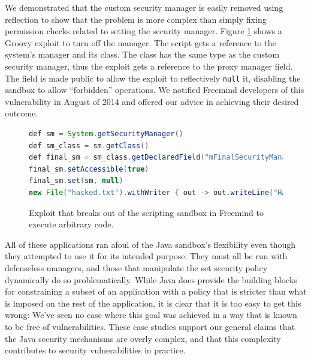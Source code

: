 \documentclass{sig-alternate-05-2015}
\begin{document}
We demonstrated that the custom security manager is easily removed
using reflection to show that the problem is more complex than simply
fixing permission checks related to setting the security manager. Figure \ref{fig:Example-Exploit-for-Freemind}
shows a Groovy exploit to turn off the manager. The script gets a reference to the system's manager
and its class. The class has the same type as the custom security
manager, thus the exploit gets a reference to the proxy manager field.
The field is made public to allow the exploit to reflectively \texttt{null}
it, disabling the sandbox to allow ``forbidden'' operations.
We notified Freemind developers of this vulnerability in August of 2014 
and offered our advice in achieving
their desired outcome. 

\begin{figure}
\begin{lstlisting}[language=Java,basicstyle={\scriptsize},breaklines=true]
def sm = System.getSecurityManager() 
def sm_class = sm.getClass() 
def final_sm = sm_class.getDeclaredField("mFinalSecurityManager")
final_sm.setAccessible(true) 
final_sm.set(sm, null)
new File("hacked.txt").withWriter { out -> out.writeLine("HACKED!") }
\end{lstlisting}
\caption{Exploit that breaks out of the scripting sandbox in Freemind\label{fig:Example-Exploit-for-Freemind}
to execute arbitrary code.}
\end{figure}

All of these applications ran afoul of the Java sandbox's flexibility even
though they attempted to use it for its intended purpose. 
They must all be run with defenseless managers, and those that 
manipulate the set security policy dynamically do so problematically.  
While Java does provide the
building blocks for constraining a subset of an application with a policy that
is stricter than what is imposed on the rest of the application, it is clear
that it is too easy to get this wrong:  We've seen no case where this goal was
achieved in a way that is known to be free of vulnerabilities. These case
studies support our general claims that the Java security mechanisms are overly
complex, and that this complexity contributes to security vulnerabilities in
practice.  
\end{document}
